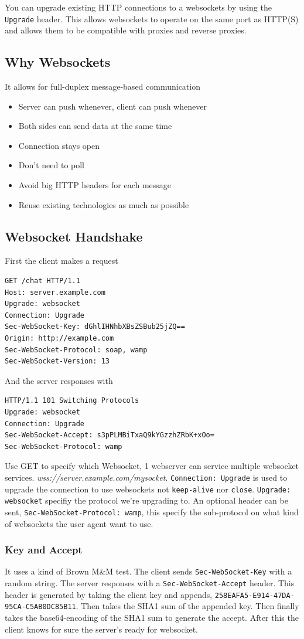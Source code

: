 \documentclass[../CMPUT-404-Notes.tex]{subfiles}
\begin{document}
You can upgrade existing HTTP connections to a websockets by using the \texttt{Upgrade} header. 
This allows websockets to operate on the same port as HTTP(S) and allows them to be compatible with proxies and reverse proxies. 

\subsection{Why Websockets}
It allows for full-duplex message-based communication
\begin{itemize}
    \item Server can push whenever, client can push whenever
    \item Both sides can send data at the same time
    \item Connection stays open
    \item Don't need to poll
    \item Avoid big HTTP headers for each message
    \item Reuse existing technologies as much as possible
\end{itemize}

\subsection{Websocket Handshake}
First the client makes a request
\begin{verbatim}
GET /chat HTTP/1.1
Host: server.example.com
Upgrade: websocket
Connection: Upgrade
Sec-WebSocket-Key: dGhlIHNhbXBsZSBub25jZQ==
Origin: http://example.com
Sec-WebSocket-Protocol: soap, wamp
Sec-WebSocket-Version: 13   
\end{verbatim}
And the server responses with 
\begin{verbatim}
HTTP/1.1 101 Switching Protocols
Upgrade: websocket
Connection: Upgrade
Sec-WebSocket-Accept: s3pPLMBiTxaQ9kYGzzhZRbK+xOo=
Sec-WebSocket-Protocol: wamp
\end{verbatim}
Use GET to specify which Websocket, 1 webserver can service multiple websocket services. 
\textit{wss://server.example.com/mysocket}.
\texttt{Connection: Upgrade} is used to upgrade the connection to use websockets not \texttt{keep-alive} nor \texttt{close}.
\texttt{Upgrade: websocket} specifiy the protocol we're upgrading to.
An optional header can be sent, \texttt{Sec-WebSocket-Protocol: wamp}, this specify the sub-protocol on what kind of websockets the user agent want to use.

\subsubsection{Key and Accept}
It uses a kind of Brown M\&M test. The client sends \texttt{Sec-WebSocket-Key} with a random string. 
The server responses with a \texttt{Sec-WebSocket-Accept} header. This header is generated by taking the client key and appends, \texttt{258EAFA5-E914-47DA-95CA-C5AB0DC85B11}. Then takes the SHA1 sum of the appended key. Then finally takes the base64-encoding of the SHA1 sum to generate the accept.
After this the client knows for sure the server's ready for websocket.
\end{document}
